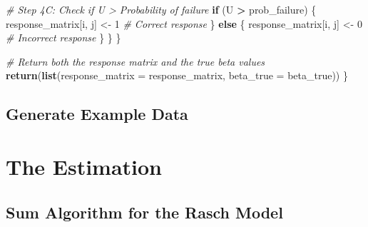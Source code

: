 \documentclass[
]{article}
\newenvironment{Shaded}{\begin{snugshade}}{\end{snugshade}}
\newcommand{\AttributeTok}[1]{\textcolor[rgb]{0.13,0.29,0.53}{#1}}
\newcommand{\CommentTok}[1]{\textcolor[rgb]{0.56,0.35,0.01}{\textit{#1}}}
\newcommand{\ControlFlowTok}[1]{\textcolor[rgb]{0.13,0.29,0.53}{\textbf{#1}}}
\newcommand{\DecValTok}[1]{\textcolor[rgb]{0.00,0.00,0.81}{#1}}
\newcommand{\FunctionTok}[1]{\textcolor[rgb]{0.13,0.29,0.53}{\textbf{#1}}}
\newcommand{\NormalTok}[1]{#1}
\newcommand{\OtherTok}[1]{\textcolor[rgb]{0.56,0.35,0.01}{#1}}
\newcommand{\SpecialCharTok}[1]{\textcolor[rgb]{0.81,0.36,0.00}{\textbf{#1}}}
\begin{document}
\begin{Shaded}
\begin{Highlighting}[]
      \CommentTok{\# Step 4C: Check if U \textgreater{} Probability of failure}
      \ControlFlowTok{if}\NormalTok{ (U }\SpecialCharTok{\textgreater{}}\NormalTok{ prob\_failure) \{}
\NormalTok{        response\_matrix[i, j] }\OtherTok{\textless{}{-}} \DecValTok{1} \CommentTok{\# Correct response}
\NormalTok{      \} }\ControlFlowTok{else}\NormalTok{ \{}
\NormalTok{        response\_matrix[i, j] }\OtherTok{\textless{}{-}} \DecValTok{0} \CommentTok{\# Incorrect response}
\NormalTok{      \}}
\NormalTok{    \}}
\NormalTok{  \}}
  
  \CommentTok{\# Return both the response matrix and the true beta values}
  \FunctionTok{return}\NormalTok{(}\FunctionTok{list}\NormalTok{(}\AttributeTok{response\_matrix =}\NormalTok{ response\_matrix, }\AttributeTok{beta\_true =}\NormalTok{ beta\_true))}
\NormalTok{\}}
\end{Highlighting}
\end{Shaded}

\subsection{Generate Example Data}\label{generate-example-data}

\begin{Shaded}
\end{Shaded}

\section{The Estimation}\label{the-estimation}

\subsection{Sum Algorithm for the Rasch
Model}\label{sum-algorithm-for-the-rasch-model}
\end{document}
